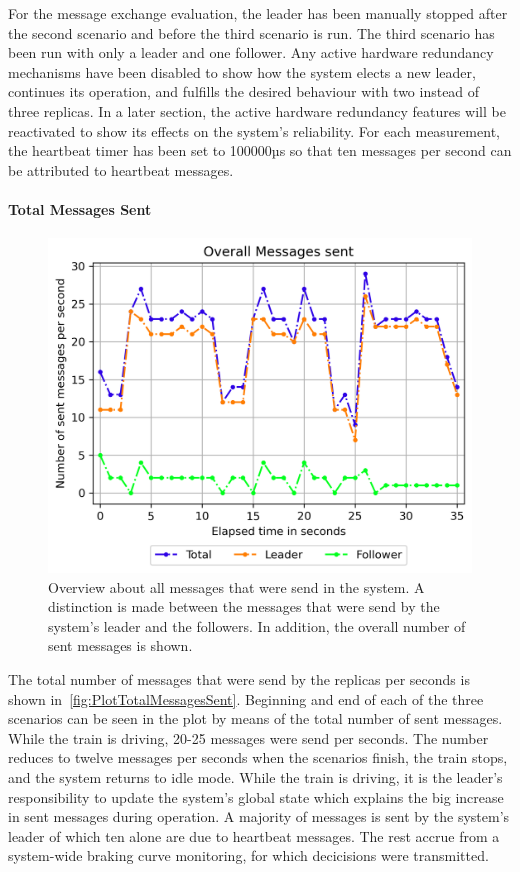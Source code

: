 For the message exchange evaluation, the leader has been manually stopped after the second scenario and before the third scenario is run.
The third scenario has been run with only a leader and one follower.
Any active hardware redundancy mechanisms have been disabled to show how the system elects a new leader, continues its operation, and fulfills the desired behaviour with two instead of three replicas.
In a later section, the active hardware redundancy features will be reactivated to show its effects on the system's reliability.
For each measurement, the heartbeat timer has been set to 100000µs so that ten messages per second can be attributed to heartbeat messages.

\paragraph{Total Messages Sent}

\begin{figure}[!hb]
	\centering
	\includegraphics[width=0.75\linewidth]{images/plots/TotalMessagesSent}
	\caption{Overview about all messages that were send in the system. A distinction is made between the messages that were send by the system's leader and the followers. In addition, the overall number of sent messages is shown.}
	\label{fig:PlotTotalMessagesSent}
\end{figure}

The total number of messages that were send by the replicas per seconds is shown in~\autoref{fig:PlotTotalMessagesSent}.
Beginning and end of each of the three scenarios can be seen in the plot by means of the total number of sent messages.
While the train is driving, 20-25 messages were send per seconds.
The number reduces to twelve messages per seconds when the scenarios finish, the train stops, and the system returns to idle mode.
While the train is driving, it is the leader's responsibility to update the system's global state which explains the big increase in sent messages during operation.
A majority of messages is sent by the system's leader of which ten alone are due to heartbeat messages.
The rest accrue from a system-wide braking curve monitoring, for which decicisions were transmitted.

